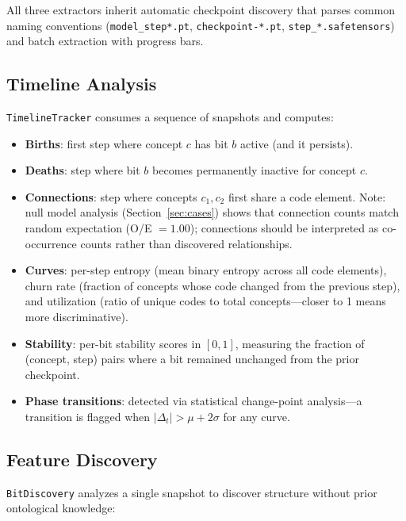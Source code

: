 \documentclass[11pt]{article}
\begin{document}
All three extractors inherit automatic checkpoint discovery that parses common naming conventions (\texttt{model\_step*.pt}, \texttt{checkpoint-*.pt}, \texttt{step\_*.safe\-tensors}) and batch extraction with progress bars.


\subsection{Timeline Analysis}

\texttt{TimelineTracker} consumes a sequence of snapshots and computes:

\begin{itemize}[nosep]
    \item \textbf{Births}: first step where concept $c$ has bit $b$ active (and it persists).
    \item \textbf{Deaths}: step where bit $b$ becomes permanently inactive for concept $c$.
    \item \textbf{Connections}: step where concepts $c_1, c_2$ first share a code element. Note: null model analysis (Section~\ref{sec:cases}) shows that connection counts match random expectation (O/E $= 1.00$); connections should be interpreted as co-occurrence counts rather than discovered relationships.
    \item \textbf{Curves}: per-step entropy (mean binary entropy across all code elements), churn rate (fraction of concepts whose code changed from the previous step), and utilization (ratio of unique codes to total concepts---closer to 1 means more discriminative).
    \item \textbf{Stability}: per-bit stability scores in $[0, 1]$, measuring the fraction of (concept, step) pairs where a bit remained unchanged from the prior checkpoint.
    \item \textbf{Phase transitions}: detected via statistical change-point analysis---a transition is flagged when $|\Delta_t| > \mu + 2\sigma$ for any curve.
\end{itemize}

\subsection{Feature Discovery}

\texttt{BitDiscovery} analyzes a single snapshot to discover structure without prior ontological knowledge:
\end{document}
